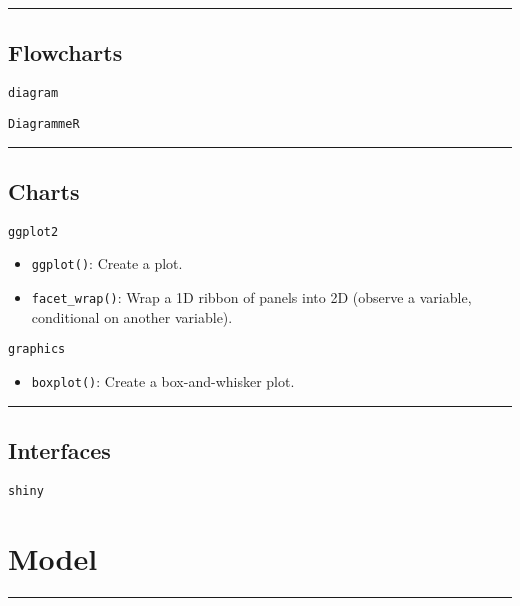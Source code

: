 \documentclass[]{book}
\providecommand{\tightlist}{%
  \setlength{\itemsep}{0pt}\setlength{\parskip}{0pt}}
\theoremstyle{definition}
\theoremstyle{definition}
\theoremstyle{definition}
\theoremstyle{remark}
\begin{document}
\begin{center}\rule{0.5\linewidth}{\linethickness}\end{center}

\section{Flowcharts}\label{flowcharts}

\texttt{diagram}

\texttt{DiagrammeR}

\begin{center}\rule{0.5\linewidth}{\linethickness}\end{center}

\section{Charts}\label{charts}

\texttt{ggplot2}

\begin{itemize}
\tightlist
\item
  \texttt{ggplot()}: Create a plot.
\item
  \texttt{facet\_wrap()}: Wrap a 1D ribbon of panels into 2D (observe a
  variable, conditional on another variable).
\end{itemize}

\texttt{graphics}

\begin{itemize}
\tightlist
\item
  \texttt{boxplot()}: Create a box-and-whisker plot.
\end{itemize}

\begin{center}\rule{0.5\linewidth}{\linethickness}\end{center}

\section{Interfaces}\label{interfaces}

\texttt{shiny}

\chapter{Model}\label{model}

\begin{center}\rule{0.5\linewidth}{\linethickness}\end{center}
\end{document}
